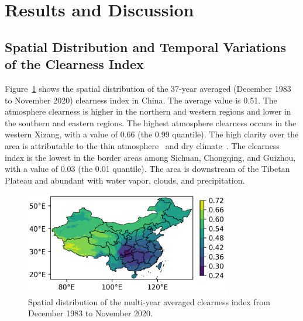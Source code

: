 \documentclass[atmosphere,article,accept,pdftex,moreauthors]{Definitions/mdpi}
\begin{document}
\section{Results and Discussion}\label{sec:results}

\subsection{Spatial Distribution and Temporal Variations of the Clearness Index}\label{sec:clearnessindexpattern}

Figure~\ref{fig:distribution} shows the spatial distribution of the 37-year averaged (December 1983 to November 2020) clearness index in China. The average value is 0.51. The atmosphere clearness is higher in the northern and western regions and lower in the southern and eastern regions. The highest atmosphere clearness occurs in the western Xizang, with a value of 0.66 (the 0.99 quantile). The high clarity over the area is attributable to the thin atmosphere~\cite{duan2012AAS} and dry climate~\cite{wang2018IJCa}. The clearness index is the lowest in the border areas among Sichuan, Chongqing, and Guizhou, with a value of 0.03 (the 0.01 quantile). The area is downstream of the Tibetan Plateau and abundant with water vapor, clouds, and precipitation.

\begin{figure}[H]
  \includegraphics[width=0.8\textwidth]{fig/distribution.png}
  \caption{Spatial distribution of the multi-year averaged clearness index from December 1983 to November 2020. \label{fig:distribution}}
\end{figure}
\end{document}
